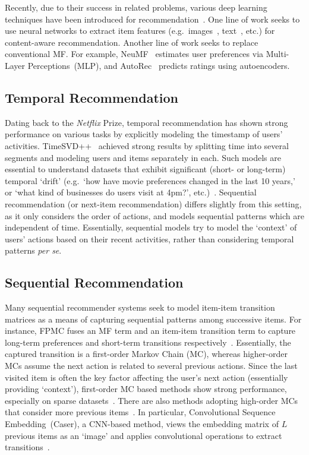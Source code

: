 \documentclass[conference]{IEEEtran}
\begin{document}
Recently, 
due to their success in related problems,
various deep learning techniques have been introduced for recommendation~\cite{DBLP:journals/corr/ZhangYS17aa}. One line of work seeks to use neural networks to extract item features (e.g.~images~\cite{wang2017your,DBLP:conf/icdm/KangFWM17}, text~\cite{DBLP:conf/kdd/WangWY15,DBLP:conf/recsys/KimPOLY16}, etc.) for content-aware recommendation. Another line of work seeks to replace conventional MF.
For example,
NeuMF~\cite{NeuMF} estimates user preferences via Multi-Layer Perceptions~(MLP), and AutoRec~\cite{sedhain2015autorec} predicts ratings using autoencoders.



\subsection{Temporal Recommendation}	

Dating back to the \emph{Netflix} Prize, temporal recommendation has shown strong performance on various tasks by explicitly modeling the timestamp of users' activities.
TimeSVD++~\cite{timeSVD} achieved 
strong
results by 
splitting
time into several segments and modeling users and items 
separately in each.
Such models are essential
to understand 
datasets that exhibit significant (short- or long-term) temporal `drift'
(e.g.~`how have movie preferences changed in the last 10 years,' or
`what 
kind of businesses do users visit at 4pm?', etc.)~\cite{DBLP:conf/wsdm/WuABSJ17,xiong2010temporal,timeSVD}. Sequential recommendation (or next-item recommendation) differs 
slightly from this setting,
as it only considers the order of actions, and models sequential patterns which are independent of time.
Essentially, sequential models try to model the `context' of users' actions based on their recent activities, rather than considering temporal patterns
\emph{per se}.

\subsection{Sequential Recommendation}

Many sequential recommender systems seek to model 
item-item transition matrices
as a means of capturing sequential patterns among
successive items. 
For instance,
FPMC fuses an MF term and an item-item transition term to capture long-term preferences and short-term transitions respectively~\cite{rendle2010fpmc}. Essentially, the captured transition is a first-order Markov Chain (MC), whereas 
higher-order MCs
assume the next 
action is
related to 
several previous actions.
Since the last visited item is often the key factor affecting the user's next action (essentially providing `context'), first-order MC based methods show strong performance, especially on sparse datasets~\cite{DBLP:conf/recsys/HeKM17}.
There are also methods adopting high-order MCs that consider more previous items~\cite{DBLP:conf/recsys/HeFWM16,DBLP:conf/icdm/HeM16}. In particular, Convolutional Sequence Embedding~(Caser), a 
CNN-based method, views the embedding matrix of $L$ previous items as an `image' and applies convolutional operations to extract transitions~\cite{DBLP:conf/wsdm/TangW18}.
\end{document}
